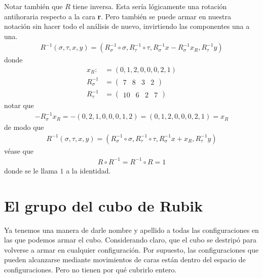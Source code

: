 \documentclass{article}
\theoremstyle{definition}
\renewcommand{\r}{\textbf{r}}
\begin{document}
Notar también que $R$ tiene inversa. Esta sería lógicamente una rotación antihoraria respecto a la cara \r{}. Pero también se puede armar en nuestra notación sin hacer todo el análisis de nuevo, invirtiendo las componentes una a una.
\begin{align*}
    R^{-1}(\sigma,\tau,x,y)=\left(R_{\sigma}^{-1}\circ \sigma,R_{\tau}^{-1}\circ \tau,R_{\sigma}^{-1}x-R_{\sigma}^{-1}x_R,R_{\tau}^{-1}y\right)
\end{align*}
donde
\begin{align*}
    x_R:            & =(0,1,2,0,0,0,2,1)  \\
    R_{\sigma}^{-1} & =\begin{pmatrix}
                           7 & 8 & 3 & 2
                       \end{pmatrix} \\
    R_{\tau}^{-1}   & =\begin{pmatrix}
                           10 & 6 & 2 & 7
                       \end{pmatrix}
\end{align*}
notar que
\begin{align*}
    -R_{\sigma}^{-1}x_R=-(0,2,1,0,0,0,1,2)=(0,1,2,0,0,0,2,1)=x_R
\end{align*}
de modo que
\begin{align*}
    R^{-1}(\sigma,\tau,x,y)=\left(R_{\sigma}^{-1}\circ \sigma,R_{\tau}^{-1}\circ \tau,R_{\sigma}^{-1}x+x_R,R_{\tau}^{-1}y\right)
\end{align*}
véase que
\begin{align*}
    R\circ R^{-1}=R^{-1}\circ R=1
\end{align*}
donde se le llama $1$ a la identidad.
\section{El grupo del cubo de Rubik}
Ya tenemos una manera de darle nombre y apellido a todas las configuraciones en las que podemos armar el cubo. Considerando claro, que el cubo se destripó para volverse a armar en cualquier configuración. Por supuesto, las configuraciones que pueden alcanzarse mediante movimientos de caras están dentro del espacio de configuraciones. Pero no tienen por qué cubrirlo entero.
\end{document}
